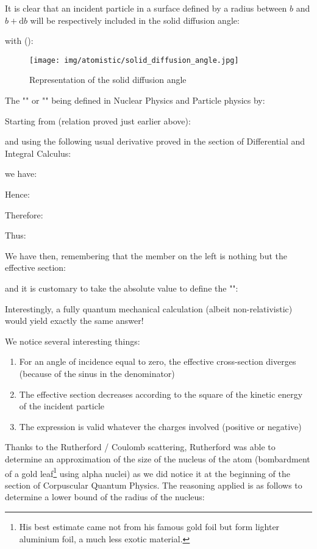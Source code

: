 	It is clear that an incident particle in a surface defined by a radius between $b$ and $b + \mathrm{d}b$ will be respectively included in the solid diffusion angle:
	
	with ():
	
	\begin{figure}[H]
		\centering
		\texttt{[image: img/atomistic/solid\_diffusion\_angle.jpg]}
		\caption{Representation of the solid diffusion angle}
	\end{figure}
	The "" or "" being defined in Nuclear Physics and Particle physics by:
	
	Starting from (relation proved just earlier above):
	
	and using the following usual derivative proved in the section of Differential and Integral Calculus:
	
	we have:
	
	Hence:
	
	Therefore:
	
	Thus:
	
	We have then, remembering that the member on the left is nothing but the effective section:
	
	and it is customary to take the absolute value to define the "":
	
	Interestingly, a fully quantum mechanical calculation (albeit non-relativistic) would yield exactly the same answer!
	
	We notice several interesting things:
	\begin{enumerate}
		\item For an angle of incidence equal to zero, the effective cross-section diverges (because of the sinus in the denominator)

		\item The effective section decreases according to the square of the kinetic energy of the incident particle

		\item The expression is valid whatever the charges involved (positive or negative)
	\end{enumerate}
	Thanks to the Rutherford / Coulomb scattering, Rutherford was able to determine an approximation of the size of the nucleus of the atom (bombardment of a gold leaf\footnote{His best estimate came not from his famous gold foil but form lighter aluminium foil, a much less exotic material.} using alpha nuclei) as we did notice it at the beginning of the section of Corpuscular Quantum Physics. The reasoning applied is as follows to determine a lower bound of the radius of the nucleus:
	
